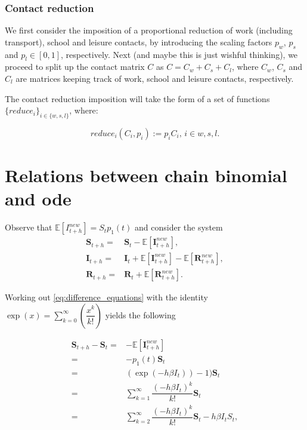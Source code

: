 \documentclass[a4paper]{article}
\renewcommand{\vec}[1]{\boldsymbol{#1}}
\theoremstyle{remark}
\begin{document}
\subsubsection{Contact reduction}
We first consider the imposition of a proportional reduction of work (including transport), school and leisure contacts, by introducing the scaling factors $p_w$, $p_s$ and $p_l\in [0,1]$, respectively. Next (and maybe this is just wishful thinking), we proceed to split up the contact matrix $C$ as $C=C_w+C_s+C_l$, where $C_w$, $C_s$ and $C_l$ are matrices keeping track of work, school and leisure contacts, respectively. 


The contact reduction imposition will take the form of a set of functions $\{reduce_i\}_{i\in\{w,s,l\}}$, where:

\begin{equation*}
\label{eq:reduction}
reduce_i(C_i,p_i):=p_iC_i,\, i\in{w,s,l}.
\end{equation*}


\section{Relations between chain binomial and ode}

Observe that 
$\mathbb{E}[I_{t+h}^{new}]=S_t p_1(t)$ and consider the system
\begin{align}
\label{eq:difference_equations}
    \vec{S}_{t+h} = {} & \vec{S}_{t} - \mathbb{E}[\vec{I}_{t+h}^{new}], \\
    \vec{I}_{t+h} = {} & \vec{I}_{t} + \mathbb{E}[\vec{I}_{t+h}^{new}] - \mathbb{E}[\vec{R}_{t+h}^{new}], \\
    \vec{R}_{t+h} = {} & \vec{R}_{t} + \mathbb{E}[\vec{R}_{t+h}^{new}]. 
    \label{eq:difference_equationsnext}
\end{align}


Working out \eqref{eq:difference_equations} with the identity $\exp(x)=\sum_{k=0}^{\infty}\left(\dfrac{x^k}{k!}\right)$ yields the following

\begin{equation*}
    \begin{split}
    \vec{S}_{t+h}-\vec{S}_{t} = {} & -\mathbb{E}[\vec{I}_{t+h}^{new}]\\
    ={}&-p_1(t)\vec{S}_{t}\\
    ={}&(\exp(-h\beta I_t))-1)\vec{S}_{t}\\
    ={}&\sum_{k=1}^{\infty}\dfrac{(-h\beta I_t)^k}{k!}\vec{S}_{t}\\
    ={}&\sum_{k=2}^{\infty}\dfrac{(-h\beta I_t)^k}{k!}\vec{S}_{t}-h\beta I_t S_t,
    \end{split}\end{equation*}
\end{document}
